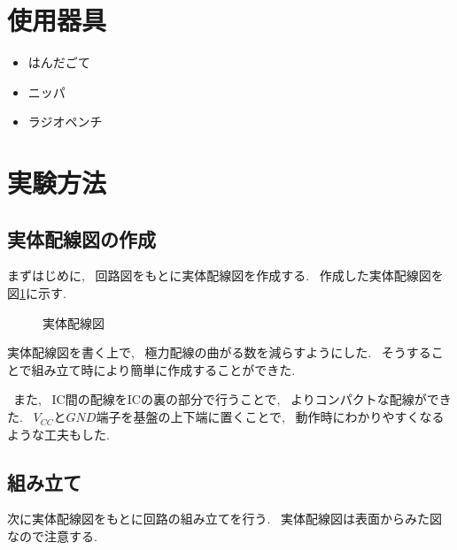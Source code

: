 \documentclass[titlepage, uplatex]{jsarticle}
\begin{document}
\section{使用器具}
	\begin{itemize}
		\item はんだごて
		\item ニッパ
		\item ラジオペンチ
	\end{itemize}

\section{実験方法}
	\subsection{実体配線図の作成}
		まずはじめに, ~回路図をもとに実体配線図を作成する.
		~作成した実体配線図を図\ref{fig:実体配線図}に示す.

		\begin{figure}[h]
			\caption{実体配線図}
			\label{fig:実体配線図}
		\end{figure}

		実体配線図を書く上で, ~極力配線の曲がる数を減らすようにした.
		~そうすることで組み立て時により簡単に作成することができた.

		~また, ~IC間の配線をICの裏の部分で行うことで, ~よりコンパクトな配線ができた.
		~$V_{CC}$と$GND$端子を基盤の上下端に置くことで, ~動作時にわかりやすくなるような工夫もした.

	\subsection{組み立て}
		次に実体配線図をもとに回路の組み立てを行う.
		~実体配線図は表面からみた図なので注意する.
\end{document}
